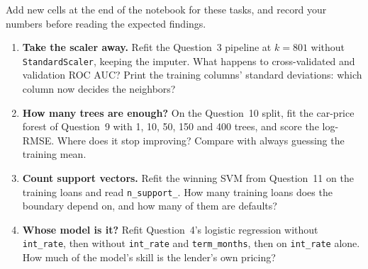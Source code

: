 \begin{yourturn}
Add new cells at the end of the notebook for these tasks, and record your numbers before reading the expected findings.
\begin{enumerate}
  \item \textbf{Take the scaler away.} Refit the Question~3 pipeline at $k=801$ without \texttt{StandardScaler}, keeping the imputer. What happens to cross-validated and validation ROC AUC? Print the training columns' standard deviations: which column now decides the neighbors?
  \item \textbf{How many trees are enough?} On the Question~10 split, fit the car-price forest of Question~9 with 1, 10, 50, 150 and 400 trees, and score the log-RMSE. Where does it stop improving? Compare with always guessing the training mean.
  \item \textbf{Count support vectors.} Refit the winning SVM from Question~11 on the training loans and read \texttt{n\_support\_}. How many training loans does the boundary depend on, and how many of them are defaults?
  \item \textbf{Whose model is it?} Refit Question~4's logistic regression without \texttt{int\_rate}, then without \texttt{int\_rate} and \texttt{term\_months}, then on \texttt{int\_rate} alone. How much of the model's skill is the lender's own pricing?
\end{enumerate}
\end{yourturn}

